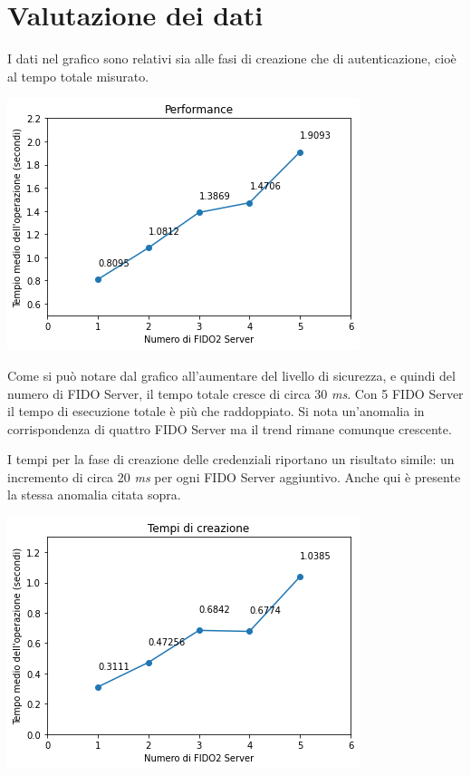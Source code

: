 \section{Valutazione dei dati}
\label{valutazione}

I dati nel grafico sono relativi sia alle fasi di creazione che di autenticazione, cioè al tempo totale misurato.
\begin{center}
	\includegraphics[scale=0.65]{figures/test_results}
\end{center}

Come si può notare dal grafico all'aumentare del livello di sicurezza, e quindi del numero di FIDO Server, il tempo totale cresce di circa 30 \emph{ms}. Con 5 FIDO Server il tempo di esecuzione totale è più che raddoppiato. Si nota un'anomalia in corrispondenza di quattro FIDO Server ma il trend rimane comunque crescente.

I tempi per la fase di creazione delle credenziali riportano un risultato simile: un incremento di circa 20 \emph{ms} per ogni FIDO Server aggiuntivo. Anche qui è presente la stessa anomalia citata sopra. 
\begin{center}
	\includegraphics[scale=0.65]{figures/creation_results}
\end{center}

